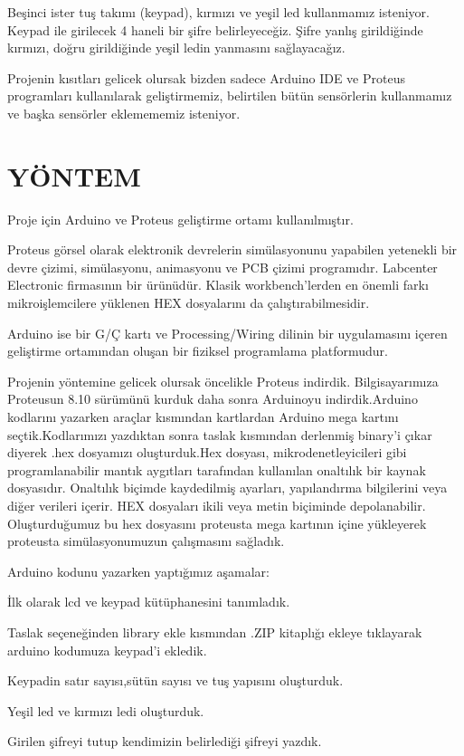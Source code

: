 \documentclass[conference]{IEEEtran}
\begin{document}
Beşinci ister tuş takımı (keypad), kırmızı ve yeşil led kullanmamız isteniyor. Keypad ile girilecek 4 haneli bir şifre belirleyeceğiz. Şifre yanlış girildiğinde kırmızı, doğru girildiğinde yeşil ledin yanmasını sağlayacağız.

Projenin kısıtları gelicek olursak bizden sadece Arduino IDE ve Proteus programları kullanılarak geliştirmemiz, belirtilen bütün sensörlerin kullanmamız ve başka sensörler eklemememiz isteniyor.


\section{YÖNTEM}
Proje için Arduino ve Proteus geliştirme ortamı kullanılmıştır.

Proteus görsel olarak elektronik devrelerin simülasyonunu yapabilen yetenekli bir devre çizimi, simülasyonu, animasyonu ve PCB çizimi programıdır. Labcenter Electronic firmasının bir ürünüdür. Klasik workbench’lerden en önemli farkı mikroişlemcilere yüklenen HEX dosyalarını da çalıştırabilmesidir.

Arduino ise bir G/Ç kartı ve Processing/Wiring dilinin bir uygulamasını içeren geliştirme ortamından oluşan bir fiziksel programlama platformudur.

Projenin yöntemine gelicek olursak öncelikle Proteus indirdik. Bilgisayarımıza Proteusun 8.10 sürümünü kurduk daha sonra Arduinoyu indirdik.Arduino kodlarını yazarken araçlar kısmından kartlardan Arduino mega kartını seçtik.Kodlarımızı yazdıktan sonra taslak kısmından derlenmiş binary'i çıkar diyerek .hex dosyamızı oluşturduk.Hex dosyası, mikrodenetleyicileri gibi programlanabilir mantık aygıtları tarafından kullanılan onaltılık bir kaynak dosyasıdır. Onaltılık biçimde kaydedilmiş ayarları, yapılandırma bilgilerini veya diğer verileri içerir. HEX dosyaları ikili veya metin biçiminde depolanabilir. Oluşturduğumuz bu hex dosyasını proteusta mega kartının içine yükleyerek proteusta simülasyonumuzun çalışmasını sağladık.

Arduino kodunu yazarken yaptığımız aşamalar:

İlk olarak lcd ve keypad kütüphanesini tanımladık.

Taslak seçeneğinden library ekle kısmından .ZIP kitaplığı ekleye tıklayarak arduino kodumuza keypad'i ekledik.

Keypadin satır sayısı,sütün sayısı ve tuş yapısını oluşturduk.

Yeşil led ve kırmızı ledi oluşturduk.

Girilen şifreyi tutup kendimizin belirlediği şifreyi yazdık.
\end{document}

